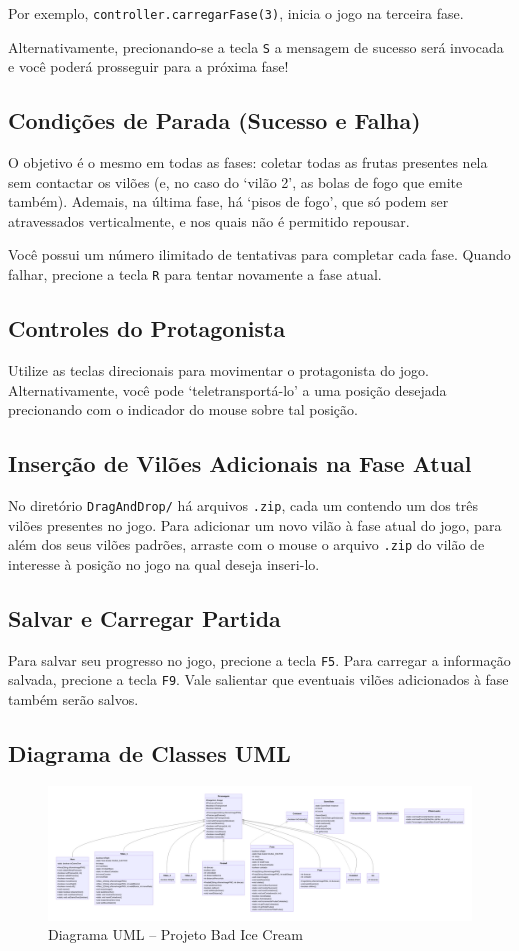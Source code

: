 \documentclass[10pt,a4paper,portuguese]{article}
\begin{document}
        Por exemplo, \verb|controller.carregarFase(3)|, inicia o jogo na terceira fase.

        Alternativamente, precionando-se a tecla \verb|S| a mensagem de sucesso será invocada e você poderá prosseguir para a próxima fase!

    \subsection{Condições de Parada (Sucesso e Falha)}
        O objetivo é o mesmo em todas as fases: coletar todas as frutas presentes nela sem contactar os vilões (e, no caso do `vilão 2', as bolas de fogo que emite também). Ademais, na última fase, há `pisos de fogo', que só podem ser atravessados verticalmente, e nos quais não é permitido repousar.
        
        Você possui um número ilimitado de tentativas para completar cada fase. Quando falhar, precione a tecla \verb|R| para tentar novamente a fase atual.
        
    \subsection{Controles do Protagonista}
        Utilize as teclas direcionais para movimentar o protagonista do jogo. Alternativamente, você pode `teletransportá-lo' a uma posição desejada precionando com o indicador do mouse sobre tal posição.
        
    \subsection{Inserção de Vilões Adicionais na Fase Atual}
        No diretório \verb|DragAndDrop/| há arquivos \verb|.zip|, cada um contendo um dos três vilões presentes no jogo. Para adicionar um novo vilão à fase atual do jogo, para além dos seus vilões padrões, arraste com o mouse o arquivo \verb|.zip| do vilão de interesse à posição no jogo na qual deseja inseri-lo.
        
    \subsection{Salvar e Carregar Partida}
        Para salvar seu progresso no jogo, precione a tecla \verb|F5|. Para carregar a informação salvada, precione a tecla \verb|F9|. Vale salientar que eventuais vilões adicionados à fase também serão salvos.

\begin{landscape}
    \section{Diagrama de Classes UML}
    \begin{figure}[H]
        \centering
        \includegraphics[width=++\linewidth]{class-diagram.png}
        \caption{Diagrama UML -- Projeto Bad Ice Cream}
        \label{fig:class-diagram}
    \end{figure}
\end{landscape}
\end{document}
